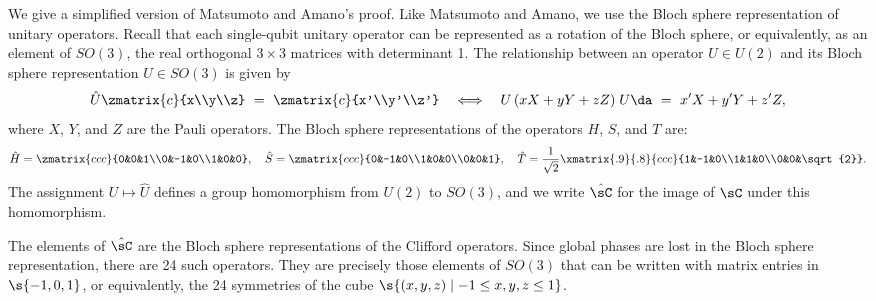 \documentclass{article}
\begin{document}
We give a simplified version of Matsumoto and Amano's proof. Like
Matsumoto and Amano, we use the Bloch sphere representation of unitary
operators.  Recall that each single-qubit unitary operator can be
represented as a rotation of the Bloch sphere, or equivalently, as an
element of $SO(3)$, the real orthogonal $3\times 3$ matrices with
determinant 1. The relationship between an operator $U\in U(2)$ and
its Bloch sphere representation $\hat U\in SO(3)$ is given by
\begin{equation}\label{eqn-bloch-conversion}
  \hat U\zmatrix{c}{x\\y\\z} ~=~ \zmatrix{c}{x'\\y'\\z'}
  \quad\Longleftrightarrow\quad
  U\,(xX+yY+zZ)\;U\da ~=~ x'X + y'Y + z'Z,
\end{equation}
where $X$, $Y$, and $Z$ are the Pauli operators. The Bloch sphere
representations of the operators $H$, $S$, and $T$ are:
\begin{equation}\label{bloch-generators}
 \hat H = \zmatrix{ccc}{0&0&1\\0&-1&0\\1&0&0}, \quad
\hat S = \zmatrix{ccc}{0&-1&0\\1&0&0\\0&0&1}, \quad
\hat T = \frac{1}{\sqrt{2}}\xmatrix{.9}{.8}{ccc}{1&-1&0\\1&1&0\\0&0&\sqrt{2}}.
\end{equation}
The assignment $U\mapsto \hat U$ defines a group homomorphism from
$U(2)$ to $SO(3)$, and we write $\hat\sC$ for the image of $\sC$ under
this homomorphism.

\begin{remark}\label{rem-bloch}
  The elements of $\hat\sC$ are the Bloch sphere representations of
  the Clifford operators. Since global phases are lost in the Bloch
  sphere representation, there are 24 such operators. They are
  precisely those elements of $SO(3)$ that can be written with matrix
  entries in $\s{-1,0,1}$, or equivalently, the 24 symmetries of the
  cube $\s{(x,y,z)\mid -1\leq x,y,z\leq 1}$.
\end{remark}
\end{document}
